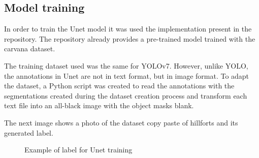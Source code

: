 \subsection{Model training}
In order to train the Unet model it was used the implementation present in the repository\cite{unetRep}. The repository already provides a pre-trained model trained with the carvana dataset.

The training dataset used was the same for YOLOv7. However, unlike YOLO, the annotations in Unet are not in text format, but in image format. To adapt the dataset, a Python script was created to read the annotations with the segmentations created during the dataset creation process and transform each text file into an all-black image with the object masks blank.

The next image shows a photo of the dataset copy paste of hillforts and its generated label.

\begin{figure}[H]
    \centering
    \qquad
    \caption{Example of label for Unet training}%
\end{figure}

